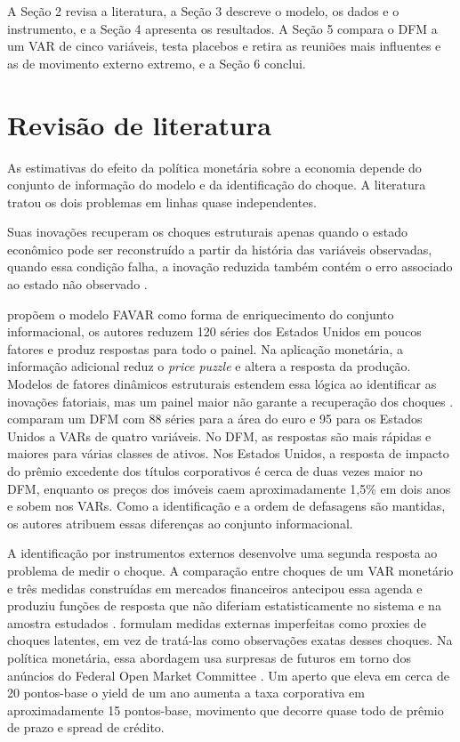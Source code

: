 \documentclass[preprint,authoryear,review,12pt]{elsarticle}
\begin{document}
A Seção 2 revisa a literatura, a Seção 3 descreve o modelo, os dados e o instrumento, e a Seção 4 apresenta os resultados. A Seção 5 compara o DFM a um VAR de cinco variáveis, testa placebos e retira as reuniões mais influentes e as de movimento externo extremo, e a Seção 6 conclui.


\section{Revisão de literatura}
\label{sec:literatura}

As estimativas do efeito da política monetária sobre a economia depende do conjunto de informação do modelo e da identificação do choque. A literatura tratou os dois problemas em linhas quase independentes.

Suas inovações recuperam os choques estruturais apenas quando o estado econômico pode ser reconstruído a partir da história das variáveis observadas, quando essa condição falha, a inovação reduzida também contém o erro associado ao estado não observado \citep{villaverde}.

\cite{bernanke} propõem o modelo FAVAR como forma de enriquecimento do conjunto informacional, os autores reduzem 120 séries dos Estados Unidos em poucos fatores e produz respostas para todo o painel. Na aplicação monetária, a informação adicional reduz o \textit{price puzzle} e altera a resposta da produção. Modelos de fatores dinâmicos estruturais estendem essa lógica ao identificar as inovações fatoriais, mas um painel maior não garante a recuperação dos choques \citep{STOCK2016415}. \cite{alessi} comparam um DFM com 88 séries para a área do euro e 95 para os Estados Unidos a VARs de quatro variáveis. No DFM, as respostas são mais rápidas e maiores para várias classes de ativos. Nos Estados Unidos, a resposta de impacto do prêmio excedente dos títulos corporativos é cerca de duas vezes maior no DFM, enquanto os preços dos imóveis caem aproximadamente 1,5\% em dois anos e sobem nos VARs. Como a identificação e a ordem de defasagens são mantidas, os autores atribuem essas diferenças ao conjunto informacional.

A identificação por instrumentos externos desenvolve uma segunda resposta ao problema de medir o choque. A comparação entre choques de um VAR monetário e três medidas construídas em mercados financeiros antecipou essa agenda e produziu funções de resposta que não diferiam estatisticamente no sistema e na amostra estudados \citep{bagliano1998}. \cite{mertensravn2013} formulam medidas externas imperfeitas como proxies de choques latentes, em vez de tratá-las como observações exatas desses choques. Na política monetária, essa abordagem usa surpresas de futuros em torno dos anúncios do Federal Open Market Committee \citep{gertler2015}. Um aperto que eleva em cerca de 20 pontos-base o yield de um ano aumenta a taxa corporativa em aproximadamente 15 pontos-base, movimento que decorre quase todo de prêmio de prazo e spread de crédito.
\end{document}
